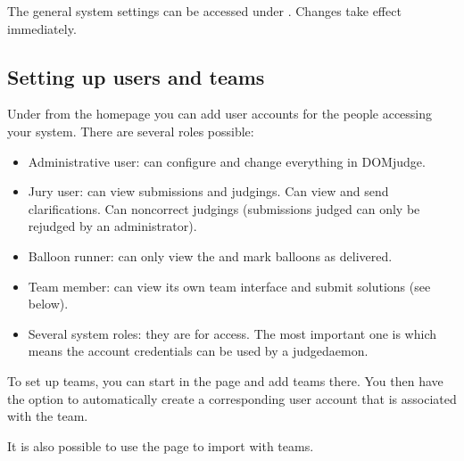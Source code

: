 \documentclass[a4paper,10pt,english,openany]{sphinxmanual}
\begin{document}
\sphinxAtStartPar
The general system settings can be accessed under
. Changes take effect immediately.


\subsection{Setting up users and teams}
\label{\detokenize{config-basic:setting-up-users-and-teams}}
\sphinxAtStartPar
Under  from the homepage you can add user accounts for the
people accessing your system. There are several roles possible:
\begin{itemize}
\item {} 
\sphinxAtStartPar
Administrative user: can configure and change everything in DOMjudge.

\item {} 
\sphinxAtStartPar
Jury user: can view submissions and judgings. Can view
{\hyperref[\detokenize{running:clarifications}]{}} and send clarifications.
Can {\hyperref[\detokenize{judging:rejudging}]{}} non\sphinxhyphen{}correct judgings (submissions judged
 can only be rejudged by an administrator).

\item {} 
\sphinxAtStartPar
Balloon runner: can only view the {\hyperref[\detokenize{running:balloons}]{}} and mark
balloons as delivered.

\item {} 
\sphinxAtStartPar
Team member: can view its own team interface and submit solutions
(see below).

\item {} 
\sphinxAtStartPar
Several system roles: they are for {\hyperref[\detokenize{develop:api}]{}} access. The most important
one is  which means the account credentials can be used by a
judgedaemon.

\end{itemize}

\sphinxAtStartPar
To set up teams, you can start in the  page and add teams there.
You then have the option to automatically create a corresponding user
account that is associated with the team.

\sphinxAtStartPar
It is also possible to use the  page to import
 with teams.
\end{document}
